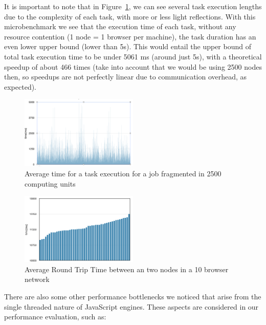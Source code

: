 It is important to note that in Figure~\ref{fig:avgtimeexec}, we can see several task execution lengths due to the complexity of each task, with more or less light reflections. With this microbenchmark we see that the execution time of each task, without any resource contention (1 node = 1 browser per machine), the task duration has an even lower upper bound (lower than 5s). This would entail the upper bound of total task execution time to be under 5061 ms (around just 5s), with a theoretical speedup of about 466 times (take into account that we would be using 2500 nodes then, so speedups are not perfectly linear due to communication overhead, as expected).

\begin{figure}[]
  \centering
  \includegraphics[width=0.5\textwidth]{figs/avg_time_exec.png}
  \caption{Average time for a task execution for a job fragmented in 2500 computing units}
  \label{fig:avgtimeexec}
\end{figure}

\begin{figure}[]
  \centering
  \includegraphics[width=0.5\textwidth]{figs/rtt.png}
  \caption{Average Round Trip Time between an two nodes in a 10 browser network}
  \label{fig:rtt}
\end{figure}


There are also some other performance bottlenecks we noticed that arise from the single threaded nature of JavaScript engines. These aspects are considered in our performance evaluation, such as:

